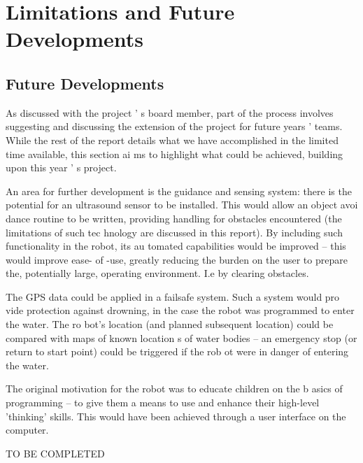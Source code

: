 \chapter{Limitations and Future Developments}\label{limitations}\label{futures}\label{section \thechapter}
\section{Future Developments}\label{Limitations and Future Developments: Future Developments}
As  discussed  with  the  project
’
s  board  member,  part  of  the  process  involves  suggesting  and 
discussing  the  extension  of  the  project  for  future  years
’
  teams.  While  the  rest  of  the  report  details 
what  we  have  accomplished  in  the  limited  time  available,  this  section  ai
ms  to  highlight  what  could 
be achieved, building upon this year
’
s project. \par
An  area  for  further  development is  the  guidance  and sensing  system:  there  is
  the  potential 
for an ultrasound sensor to be installed. This would allow an object avoi
dance routine to be written, 
providing  handling  for  obstacles  encountered  (the  limitations  of  such  tec
hnology  are  discussed  in 
this  report).  By  including  such  functionality  in  the  robot,  its  au
tomated  capabilities  would  be 
improved 
–
 this would improve ease-
of
-use, greatly reducing the burden on the user to prepare the, 
potentially large, operating environment. I.e by clearing obstacles.  \par
The GPS data could be applied in a failsafe system. Such a system would pro
vide protection 
against  drowning,  in  the  case  the  robot  was  programmed  to  enter  the  water.  The  ro
bot's  location 
(and  planned  subsequent  location)  could  be  compared  with  maps  of  known  location
s  of  water 
bodies 
–
 an emergency stop (or return to start point) could be triggered if the rob
ot were in danger 
of entering the water.  \par
The original motivation for the robot was to educate children on the b
asics of programming 
–
  to  give  them  a  means  to  use  and  enhance  their  high-level  'thinking' 
skills.  This  would  have  been 
achieved through a user interface on the computer. \par

TO BE COMPLETED
